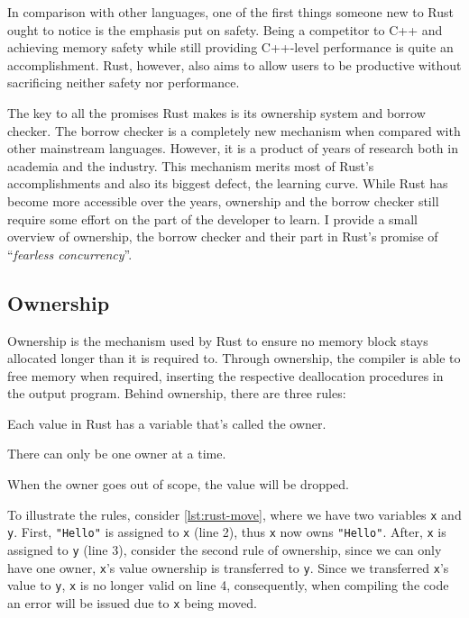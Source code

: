 In comparison with other languages, one of the first things someone new to Rust ought to notice is the emphasis put on safety.
Being a competitor to C++ and achieving memory safety while still providing C++-level performance is quite an accomplishment.
Rust, however, also aims to allow users to be productive without sacrificing neither safety nor performance.

The key to all the promises Rust makes is its ownership system and borrow checker.
The borrow checker is a completely new mechanism when compared with other mainstream languages.
However, it is a product of years of research both in academia and the industry.
This mechanism merits most of Rust's accomplishments and also its biggest defect, the learning curve.
While Rust has become more accessible over the years,
ownership and the borrow checker still require some effort on the part of the developer to learn.
I provide a small overview of ownership, the borrow checker and their part in Rust's promise of “\emph{fearless concurrency}”.

\subsection{Ownership}\label{sec:rust-lang:ownership}

Ownership is the mechanism used by Rust to ensure no memory block stays allocated longer than it is required to.
Through ownership, the compiler is able to free memory when required,
inserting the respective deallocation procedures in the output program.
Behind ownership, there are three rules:

\begin{displayquote}
    \begin{compactitem}
        \item Each value in Rust has a variable that’s called the owner.
        \item There can only be one owner at a time.
        \item When the owner goes out of scope, the value will be dropped.
    \end{compactitem}
\end{displayquote}

To illustrate the rules, consider \autoref{lst:rust-move}, where we have two variables \texttt{x} and \texttt{y}.
First, \texttt{"Hello"} is assigned to \texttt{x} (line 2), thus \texttt{x} now owns \texttt{"Hello"}.
After, \texttt{x} is assigned to \texttt{y} (line 3),
consider the second rule of ownership, since we can only have one owner,
\texttt{x}'s value ownership is transferred to \texttt{y}.
Since we transferred \texttt{x}'s value to \texttt{y}, \texttt{x} is no longer valid on line 4, consequently,
when compiling the code an error will be issued due to \texttt{x} being moved.

